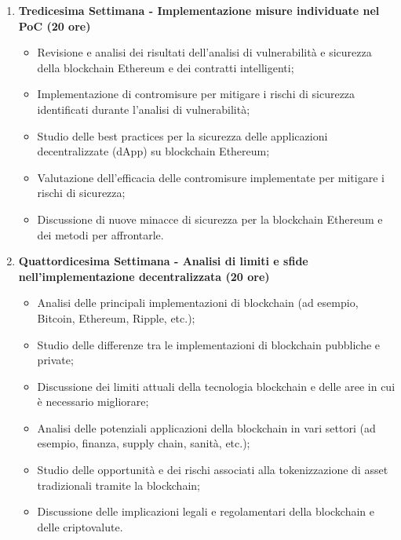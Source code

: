{\begin{enumerate}
        \item \textbf{Tredicesima Settimana - Implementazione misure individuate nel PoC (20 ore)}
        \begin{itemize}
            \item Revisione e analisi dei risultati dell'analisi di vulnerabilità e sicurezza della blockchain Ethereum e dei contratti intelligenti;
            \item Implementazione di contromisure per mitigare i rischi di sicurezza identificati durante l'analisi di vulnerabilità;
            \item Studio delle best practices per la sicurezza delle applicazioni decentralizzate (dApp) su blockchain Ethereum;
            \item Valutazione dell'efficacia delle contromisure implementate per mitigare i rischi di sicurezza;
            \item Discussione di nuove minacce di sicurezza per la blockchain Ethereum e dei metodi per affrontarle.
        \end{itemize}
        
        \item \textbf{Quattordicesima Settimana - Analisi di limiti e sfide nell'implementazione decentralizzata (20 ore)}
        \begin{itemize}
            \item Analisi delle principali implementazioni di blockchain (ad esempio, Bitcoin, Ethereum, Ripple, etc.);
            \item Studio delle differenze tra le implementazioni di blockchain pubbliche e private;
            \item Discussione dei limiti attuali della tecnologia blockchain e delle aree in cui è necessario migliorare;
            \item Analisi delle potenziali applicazioni della blockchain in vari settori (ad esempio, finanza, supply chain, sanità, etc.);
            \item Studio delle opportunità e dei rischi associati alla tokenizzazione di asset tradizionali tramite la blockchain;
            \item Discussione delle implicazioni legali e regolamentari della blockchain e delle criptovalute.
        \end{itemize}


\end{enumerate}}
